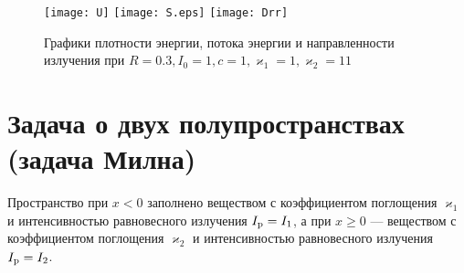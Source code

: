 \begin{figure}[ht!]%
\centering
\texttt{[image: U]}\quad%
\texttt{[image: S.eps]}\quad%
\texttt{[image: Drr]}%
\caption{Графики плотности энергии, потока энергии и направленности излучения при $R = 0.3, I_0 = 1, c = 1, \varkappa_1 = 1, \varkappa_2 = 11$}%
\end{figure}

\section{Задача о двух полупространствах (задача Милна)}
\label{sec:milne}

Пространство при $x < 0$ заполнено веществом с коэффициентом поглощения $\varkappa_1$ и интенсивностью равновесного излучения $I_\text{p} = I_1$,
а при $x \geq 0$ --- веществом с коэффициентом поглощения $\varkappa_2$ и интенсивностью равновесного излучения $I_\text{p} = I_2$.

